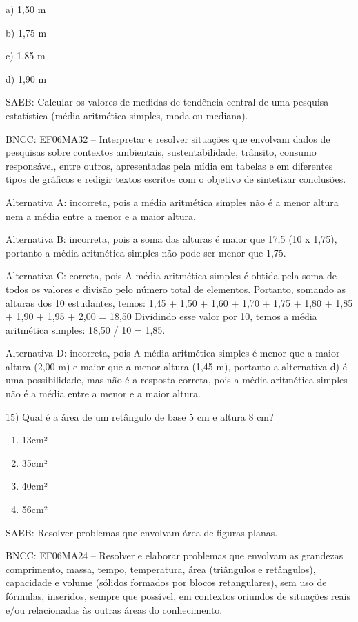 a) 1,50 m

b) 1,75 m

c) 1,85 m

d) 1,90 m

SAEB: Calcular os valores de medidas de tendência central de uma
pesquisa estatística (média aritmética simples, moda ou mediana).

BNCC: EF06MA32 -- Interpretar e resolver situações que envolvam dados de
pesquisas sobre contextos ambientais, sustentabilidade, trânsito,
consumo responsável, entre outros, apresentadas pela mídia em tabelas e
em diferentes tipos de gráficos e redigir textos escritos com o objetivo
de sintetizar conclusões.

Alternativa A: incorreta, pois a média aritmética simples não é a menor
altura nem a média entre a menor e a maior altura.

Alternativa B: incorreta, pois a soma das alturas é maior que 17,5 (10 x
1,75), portanto a média aritmética simples não pode ser menor que 1,75.

Alternativa C: correta, pois A média aritmética simples é obtida pela
soma de todos os valores e divisão pelo número total de elementos.
Portanto, somando as alturas dos 10 estudantes, temos: 1,45 + 1,50 +
1,60 + 1,70 + 1,75 + 1,80 + 1,85 + 1,90 + 1,95 + 2,00 = 18,50 Dividindo
esse valor por 10, temos a média aritmética simples: 18,50 / 10 = 1,85.

Alternativa D: incorreta, pois A média aritmética simples é menor que a
maior altura (2,00 m) e maior que a menor altura (1,45 m), portanto a
alternativa d) é uma possibilidade, mas não é a resposta correta, pois a
média aritmética simples não é a média entre a menor e a maior altura.

15) Qual é a área de um retângulo de base 5 cm e altura 8 cm?

\begin{enumerate}
\def\labelenumi{\alph{enumi})}
\item
  13cm²
\item
  35cm²
\item
  40cm²
\item
  56cm²
\end{enumerate}

SAEB: Resolver problemas que envolvam área de figuras planas.

BNCC: EF06MA24 -- Resolver e elaborar problemas que envolvam as
grandezas comprimento, massa, tempo, temperatura, área (triângulos e
retângulos), capacidade e volume (sólidos formados por blocos
retangulares), sem uso de fórmulas, inseridos, sempre que possível, em
contextos oriundos de situações reais e/ou relacionadas às outras áreas
do conhecimento.

